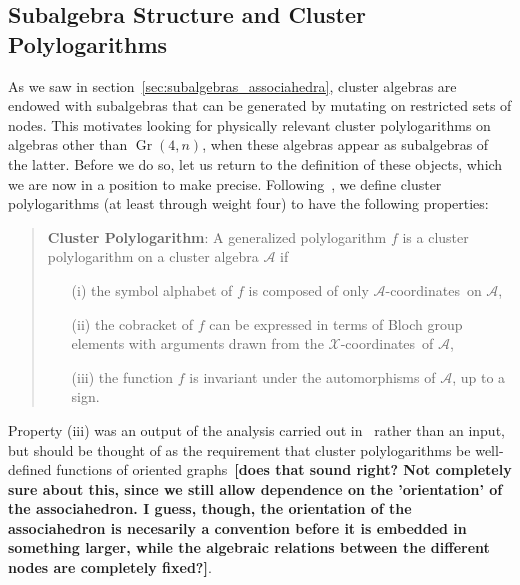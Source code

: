 \documentclass[11pt]{article}
\DeclareMathOperator{\Gr}{Gr}
\def\x{\mathcal{X}}
\def\xcoords{$\mathcal{X}$-coordinates}
\def\a{\mathcal{A}}
\def\acoords{$\mathcal{A}$-coordinates}
\def\draftnote#1{{\bf [#1]}}
\begin{document}
\subsection{Subalgebra Structure and Cluster Polylogarithms}


As we saw in section~\ref{sec:subalgebras_associahedra}, cluster algebras are endowed with subalgebras that can be generated by mutating on restricted sets of nodes. This motivates looking for physically relevant cluster polylogarithms on algebras other than $\Gr(4,n)$, when these algebras appear as subalgebras of the latter. Before we do so, let us return to the definition of these objects, which we are now in a position to make precise. Following~\cite{Golden:2014xqa}, we define cluster polylogarithms (at least through weight four) to have the following properties:
\begin{quote}
{\bf Cluster Polylogarithm}: A generalized polylogarithm $f$ is a cluster polylogarithm on a cluster algebra $\a$ if
\vspace{-.2cm}
 \begin{itemize}
 \item[(i)] the symbol alphabet of $f$ is composed of only \acoords\ on $\a$, 
 \item[(ii)] the cobracket of $f$ can be expressed in terms of Bloch group elements with arguments drawn from the \xcoords\ of $\a$,
 \item[(iii)] the function $f$ is invariant under the automorphisms of $\a$, up to a sign.
 \end{itemize}
\end{quote}
Property (iii) was an output of the analysis carried out in~\cite{Golden:2014xqa} rather than an input, but should be thought of as the requirement that cluster polylogarithms be well-defined functions of oriented graphs~\draftnote{does that sound right? Not completely sure about this, since we still allow dependence on the 'orientation' of the associahedron. I guess, though, the orientation of the associahedron is necesarily a convention before it is embedded in something larger, while the algebraic relations between the different nodes are completely fixed?}.  
\end{document}
